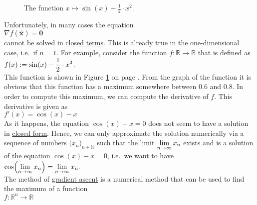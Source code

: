 \begin{figure}[!th]
\centering
\hspace*{-1.3cm}
\vspace*{-0.3cm}
\caption{The function $x \mapsto \sin(x) - \frac{1}{2} \cdot x^2$.}
\label{fig:sin-minus-square.pdf}
\end{figure}

\noindent
Unfortunately, in many cases the equation 
\\[0.2cm]
\hspace*{1.3cm}
$\nabla f(\mathbf{\widehat{x}}) = \mathbf{0}$
\\[0.2cm]
cannot be solved in \href{https://en.wikipedia.org/wiki/Closed-form_expression}{closed terms}.  This is already
true in the one-dimensional case, i.e.~if $n=1$.  For example, consider 
the function $f:\mathbb{R} \rightarrow \mathbb{R}$ that is defined as
\\[0.2cm]
\hspace*{1.3cm}
$\displaystyle f(x) := \sin(x) - \frac{1}{2} \cdot x^2$.
\\[0.2cm]
This function is shown in Figure \ref{fig:sin-minus-square.pdf} on page \pageref{fig:sin-minus-square.pdf}.
From the graph of the function it is obvious that this function has a maximum somewhere between $0.6$ and
$0.8$.  In order to compute this maximum, we can compute the derivative of $f$.   This derivative is given as 
\\[0.2cm]
\hspace*{1.3cm}
$f'(x) = \cos(x) - x$
\\[0.2cm]
As it happens, the equation $\cos(x) - x = 0$ does not seem to have a solution in 
\href{https://en.wikipedia.org/wiki/Closed-form_expression}{closed form}.  Hence, we can only approximate
the solution numerically via a sequence of numbers $(x_n\bigr)_{n\in\mathbb{N}}$ such that the limit
$\displaystyle \lim\limits_{n\rightarrow\infty} x_n$
exists and is a solution of the equation $\cos(x) - x = 0$, i.e.~we want to have
\\[0.2cm]
\hspace*{1.3cm}
$\displaystyle \cos\Bigl(\lim\limits_{n\rightarrow\infty} x_n\Bigr) = \lim\limits_{n\rightarrow\infty} x_n$.
\\[0.2cm]
The method of \href{https://en.wikipedia.org/wiki/Gradient_descent}{gradient ascent} is a numerical
method that can be used to find the maximum of a function 
\\[0.2cm]
\hspace*{1.3cm}
$f: \mathbb{R}^n \rightarrow \mathbb{R}$
